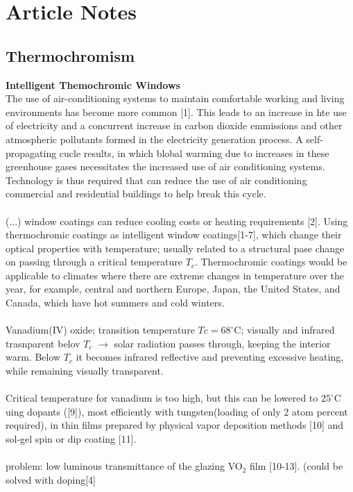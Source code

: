 \section{Article Notes}
\subsection{Thermochromism}
\cite{intelligentWindows} 
\textbf{Intelligent Themochromic Windows} \\
The use of air-conditioning systems to maintain comfortable working and 
living environments has become more common [1]. This leads to an increase in hte use
of electricity and a concurrent increase in carbon dioxide emmissions and other 
atmospheric pollutants formed in the electricity generation process. A self-propagating cucle results,
in which blobal warming due to increases in these greenhouse gases necessitates the increased 
use of air conditioning systems. Technology is thus required that can reduce the use of air conditioning
commercial and residential buildings to help break this cycle. \\
\\
(...) window coatings can reduce cooling costs or heating requirements [2]. 
Using thermochromic coatings as intelligent window coatings[1-7], which change
their optical properties with temperature; usually related to a structural pase change on passing through a 
critical temperature $T_c$. Thermochromic coatings would be applicable to climates where there are extreme 
changes in temperature over the year, for example, central and northern Europe, Japan, the United States, 
and Canada, which have hot summers and cold winters. \\
\\
Vanadium(IV) oxide; transition temperature $Tc = 68 ^{\circ}$C; visually and infrared trasnparent belov $T_c$ 
$\rightarrow$ solar radiation passes through, keeping the interior warm. Below $T_c$ it becomes infrared reflective
and preventing excessive heating, while remaining visually transparent.\\
\\
Critical temperature for vanadium is too high, but this can be lowered to $25^{\circ}$C uing dopants ([9]),
most efficiently with tungsten(loading of only 2 atom percent required), in thin films prepared by physical 
vapor deposition methods [10] and sol-gel spin or dip coating [11]. \\
\\
problem: low luminous transmittance of the glazing VO$_2$ film [10-13]. (could be solved with doping[4]
